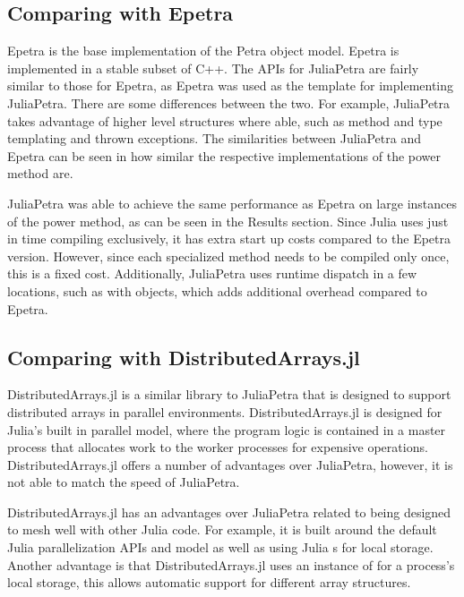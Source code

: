 \documentclass[acmsmall]{acmart}
\newcommand{\juliaSnippet}[1]{\texttt{\detokenize{#1}}}
\begin{document}
\subsection{Comparing with Epetra}

Epetra is the base implementation of the Petra object model.
Epetra is implemented in a stable subset of C++. \cite{OverviewOfTrilinos}
The APIs for JuliaPetra are fairly similar to those for Epetra,
as Epetra was used as the template for implementing JuliaPetra.
There are some differences between the two.
For example, JuliaPetra takes advantage of higher level structures where able,
such as method and type templating and thrown exceptions.
The similarities between JuliaPetra and Epetra can be seen in how similar the respective implementations
of the power method are.

JuliaPetra was able to achieve the same performance as Epetra on large instances of the power method,
as can be seen in the Results section.
Since Julia uses just in time compiling exclusively, it has extra start up costs compared to
the Epetra version. However, since each specialized method needs to be compiled only once,
this is a fixed cost.
Additionally, JuliaPetra uses runtime dispatch in a few locations, such as with
\juliaSnippet{Comm} objects, which adds additional overhead compared to Epetra.

\subsection{Comparing with DistributedArrays.jl}

DistributedArrays.jl is a similar library to JuliaPetra that is designed to support
distributed arrays in parallel environments. \cite{DAGithub}
DistributedArrays.jl is designed for Julia's built in parallel model, where the program logic is
contained in a master process that allocates work to the worker processes for expensive operations.
\cite{JuliaFreshApproach}
DistributedArrays.jl offers a number of advantages over JuliaPetra, however, it is not able to
match the speed of JuliaPetra.

DistributedArrays.jl has an advantages over JuliaPetra related to being designed to mesh well
with other Julia code.
For example, it is built around the default Julia parallelization APIs and model as well as using
Julia \juliaSnippet{AbstractArray}s for local storage.
Another advantage is that DistributedArrays.jl uses an instance of \juliaSnippet{AbstractArray}
for a process's local storage, this allows automatic support for different array structures.
\end{document}
